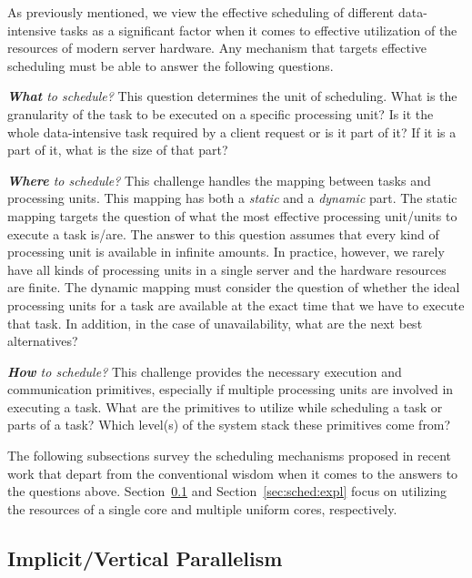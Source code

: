 \documentclass[11pt,dvipdfm]{article}
\newcommand{\refsec}[1]{Section~\ref{sec:#1}}
\begin{document}
As previously mentioned,
we view the effective scheduling of different data-intensive tasks as a significant factor
when it comes to effective utilization of the resources of modern server hardware.
Any mechanism that targets effective scheduling must be able to answer the following questions. 

\textit{\textbf{What} to schedule?}
This question determines the unit of scheduling.
What is the granularity of the task to be executed on a specific processing unit?
Is it the whole data-intensive task required by a client request or is it part of it?
If it is a part of it, what is the size of that part?

\textit{\textbf{Where} to schedule?}
This challenge handles the mapping between tasks and processing units.
This mapping has both a \textit{static} and a \textit{dynamic} part.
The static mapping targets the question of what the most effective processing unit/units to execute a task is/are.
The answer to this question assumes that every kind of processing unit is available in infinite amounts.
In practice, however, we rarely have all kinds of processing units in a single server and the hardware resources are finite.
The dynamic mapping must consider the question of whether the ideal processing units
for a task are available at the exact time that we have to execute that task.
In addition, in the case of unavailability, what are the next best alternatives?

\textit{\textbf{How} to schedule?}
This challenge provides the necessary execution and communication primitives,
especially if multiple processing units are involved in executing a task.
What are the primitives to utilize while scheduling a task or parts of a task?
Which level(s) of the system stack these primitives come from? 

The following subsections survey the scheduling mechanisms proposed in recent work that
depart from the conventional wisdom when it comes to the answers to the questions above.
\refsec{sched:impl} and \refsec{sched:expl} focus on utilizing the resources of
a single core and multiple uniform cores, respectively.

\subsection{Implicit/Vertical Parallelism}
\label{sec:sched:impl}
\end{document}
